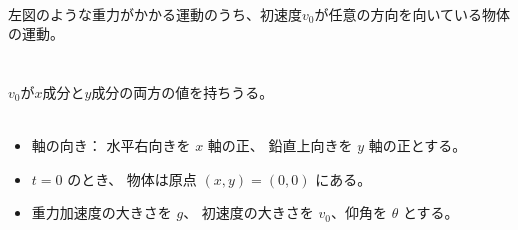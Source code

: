 \documentclass[11pt,twoside]{article}
\begin{document}
		\hfill	
		\begin{minipage}[t]{0.52\linewidth}
			\\
			左図のような重力がかかる運動のうち、初速度$v_0$が任意の方向を向いている物体の運動。\\\\
			\\
			$v_0$が$x$成分と$y$成分の両方の値を持ちうる。\\\\
				\begin{itemize}[leftmargin=2em,itemsep=0pt,topsep=2pt]
					\item[(i)]
					軸の向き：
					水平右向きを $x$ 軸の正、
					鉛直上向きを $y$ 軸の正とする。
	
					\item[(ii)]
					$t=0$ のとき、
					物体は原点 $(x,y)=(0,0)$ にある。
	
					\item[(iii)]
					重力加速度の大きさを $g$、
					初速度の大きさを $v_0$、仰角を $\theta$ とする。
	

\end{itemize}
\end{minipage}
\end{document}
